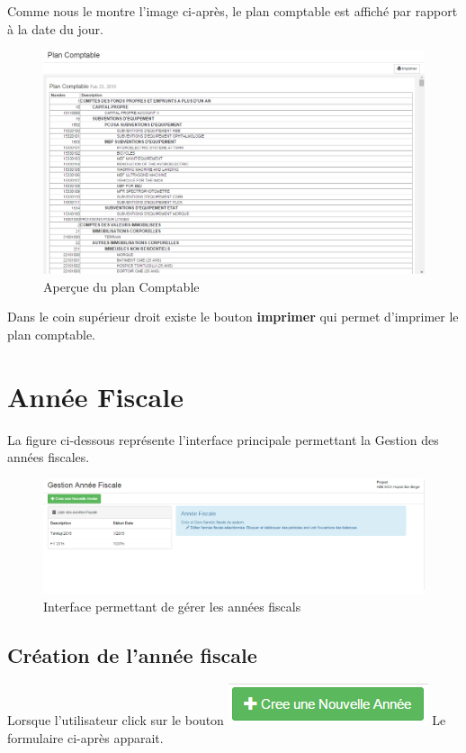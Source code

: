 \documentclass[12pt,a4paper]{report}
\begin{document}
Comme nous le montre l'image ci-après, le plan comptable est affiché par rapport à la date du jour.\\

\begin{figure}[h]
\begin{center}
\includegraphics[width=14cm]{pic/PlanComptable.png}
\end{center}
\caption{Aperçue du plan Comptable}
\label{Aperçue du plan Comptable}
\end{figure}

Dans le coin supérieur droit existe le bouton \textbf{imprimer} qui permet d'imprimer le plan comptable.
\section{Année Fiscale}
La figure ci-dessous représente l'interface principale permettant la Gestion des années fiscales. 
\begin{figure}[h]
\begin{center}
\includegraphics[width=14cm]{pic/AnneeFiscal.png}
\end{center}
\caption{Interface permettant de gérer les années fiscals}
\label{Interface permettant de gérer les années fiscals}
\end{figure}

\newpage
\subsection{Création de l'année fiscale}
Lorsque l'utilisateur click sur le bouton \includegraphics[scale=0.7]{pic/CreeAnnFisc.png} Le formulaire ci-après apparait.
\end{document}
